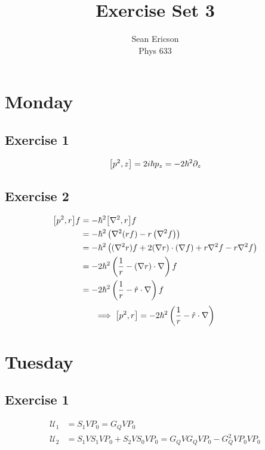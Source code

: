 \documentclass[12pt]{article}
\begin{document}
	
\title{Exercise Set 3}
\author{Sean Ericson \\ Phys 633}
\maketitle

\section*{Monday}
\subsection*{Exercise 1}
\[ \comm{p^2}{z} = 2i\hbar p_z = -2\hbar^2\partial_z \]

\subsection*{Exercise 2}
\begin{align*}
    \comm{p^2}{r}f &= -\hbar^2\comm{\nabla^2}{r}f \\
    &= -\hbar^2\left(\nabla^2(rf) - r\left(\nabla^2f\right)\right) \\
    &= -\hbar^2\left((\nabla^2r)f + 2(\nabla r)\cdot(\nabla f) + r\nabla^2f - r\nabla^2 f\right) \\
    &= -2\hbar^2\left(\frac{1}{r} - (\nabla r)\cdot\nabla\right)f \\
    &= -2\hbar^2\left(\frac{1}{r} - \hat{r}\cdot\nabla\right)f
\end{align*}
\[ \implies \comm{p^2}{r} = -2\hbar^2\left(\frac{1}{r} - \hat{r}\cdot\nabla\right) \]

\section*{Tuesday}
\subsection*{Exercise 1}
\begin{align*}
    \mathscr{U}_1 &= S_1VP_0 = G_QVP_0 \\
    \mathscr{U}_2 &= S_1VS_1VP_0 + S_2VS_0VP_0 = G_QVG_QVP_0 - G_Q^2VP_0VP_0
\end{align*}
\end{document}
